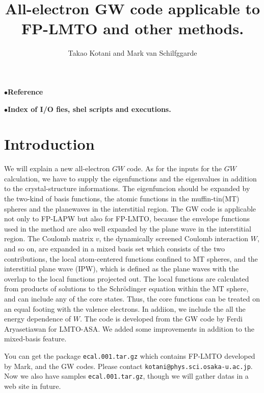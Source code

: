 \documentclass[a4paper,10pt,epsf,fleqn]{article}
\begin{document}
\baselineskip=6mm
\title{All-electron GW code applicable to FP-LMTO and other methods.}
\author{Takao Kotani and Mark van Schilfggarde}
\maketitle
\tableofcontents

\vspace{5mm}
\noindent$\bullet${\bf Reference}

\vspace{5mm}
\noindent$\bullet${\bf Index of I/O fies, shel scripts and executions.}

\newpage
\section{Introduction}
We will explain a new all-electron $GW$ code.
As for the inputs for the $GW$ calculation, 
we have to supply the eigenfunctions and the eigenvalues
in addition to the crystal-structure informations.
The eigenfuncion should be expanded by
the two-kind of basis functions,
the atomic functions in the muffin-tin(MT) spheres and
the planewaves in the interstitial region.
The GW code is applicable not only to FP-LAPW but also for FP-LMTO,
because the envelope functions used in the method are also well expanded
by the plane wave in the interstitial region. 
The Coulomb matrix $v$, the dynamically screened
Coulomb interaction $W$, and so on, are expanded in a mixed basis set
which consists of the two contributions, 
the local atom-centered functions confined to MT spheres, 
and the interstitial plane wave (IPW), which is defined as
the plane waves with the overlap to the local
functions projected out.
The local functions are calculated from products of
solutions to the Schr\"odinger equation within the
MT sphere, and can include any of the core states.
Thus, the core functions can be treated on an equal footing
with the valence electrons.
In addiion, we include the all the energy dependence of $W$.
The code is developed from the GW code by Ferdi Aryasetiawan for LMTO-ASA.
We added some improvements in addition to the mixed-basis feature.

You can get the package {\tt ecal.001.tar.gz} which contains FP-LMTO developed by Mark,
and the GW codes. Please contact {\tt kotani@phys.sci.osaka-u.ac.jp}.
Now we also have samples {\tt ecal.001.tar.gz}, though we will gather datas 
in a web site in future.


\newpage
\end{document}
